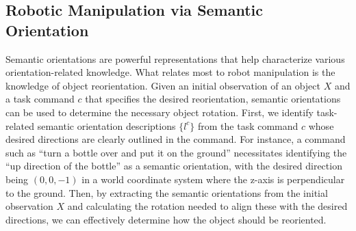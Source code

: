 \subsection{Robotic Manipulation via Semantic Orientation}
Semantic orientations are powerful representations that help characterize various orientation-related knowledge. What relates most to robot manipulation is the knowledge of object reorientation. Given an initial observation of an object $X$ and a task command $c$ 
that specifies the desired reorientation, semantic orientations can be used to determine the necessary object rotation.
First, we identify task-related semantic orientation descriptions $\{l^{c}\}$ from the task command $c$ whose desired directions are clearly outlined in the command. For instance, a command such as ``turn a bottle over and put it on the ground'' necessitates identifying the ``up direction of the bottle'' as a semantic orientation, with the desired direction being $(0,0,-1)$ in a world coordinate system where the z-axis is perpendicular to the ground. Then, by extracting the semantic orientations from the initial observation $X$ and calculating the rotation needed to align these with the desired directions, we can effectively determine how the object should be reoriented.

